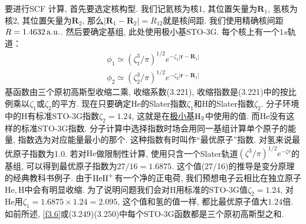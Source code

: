 要进行SCF
计算, 首先要选定核构型. 我们记氦核为核1, 其位置矢量为$\mathbf{R}_1$, 氢核为核2, 其位置矢量为$\mathbf{R}_2$, 那么$|\mathbf{R}_1-\mathbf{R}_2|=R_{12}$就是核间距. 我们使用精确核间距$R=1.4632\,\mathrm{a.u.}$. 然后要确定基组, 此处使用极小基STO-3G. 每个核上有一个$1s$轨道：
\begin{align}
\phi_1 \simeq (\zeta_1^3/\pi)^{1/2} e^{-\zeta_1|\mathbf{r-R}_1|}\\
\phi_2 \simeq (\zeta_2^3/\pi)^{1/2} e^{-\zeta_2|\mathbf{r-R}_1|}
\end{align}
基函数由三个原初高斯型收缩二乘, 收缩系数(3.221), 收缩指数是(3.221)中的按比例乘以$\zeta_1$或$\zeta_2$的平方. 现在只要确定$\mathrm{He}$的Slater指数$\zeta_1$和$\mathrm{H}$的Slater指数$\zeta_2$. 分子环境中的$\mathrm{H}$有标准STO-3G指数$\zeta_2=1.24$, 这就是在\underline{极小基$\mathrm{H}_2$}中使用的值. 而$\mathrm{He}$没有这样的标准STO-3G指数. 分子计算中选择指数时场会用同一基组计算单个原子的能量, 指数选为对应能量最小的那个. 这种指数有时叫作``最优原子''指数. 对氢来说最优原子指数为1.0. 若对$\mathrm{He}$做限制性\hft 计算, 使用只含一个Slater轨道$(\zeta^3/\pi)^{1/2}e^{-\zeta r}$的基组, 可以得到最优原子指数为$27/16=1.6875$. 这个值(27/16)的推导是变分原理的经典教科书例子. 由于$\mathrm{HeH}^+$有一个净的正电荷, 我们预想电子云相比在独立原子$\mathrm{He,H}$中会有明显收缩. 为了说明问题我们会对$\mathrm{H}$用标准的STO-3G值$\zeta_2=1.24$, 对$\mathrm{He}$用$\zeta_1=1.6875\times 1.24=2.095$, 这个值和氢的值一样, 都比最优原子值大$1.24$倍. 如前所述, \ref{f3.6}或(3.249)(3.250)中每个STO-3G函数都是三个原初高斯型之和.


